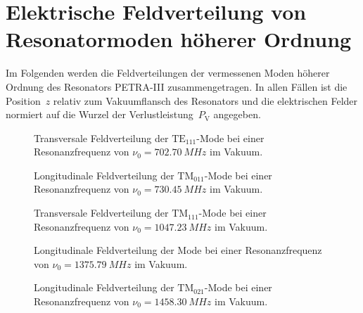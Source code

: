 \section{Elektrische Feldverteilung von Resonatormoden höherer Ordnung}
\label{app:hom_felder}
\FloatBarrier
Im Folgenden werden die Feldverteilungen der vermessenen Moden höherer Ordnung des Resonators PETRA-III zusammengetragen.
In allen Fällen ist die Position~$z$ relativ zum Vakuumflansch des Resonators und die elektrischen Felder normiert auf die Wurzel der Verlustleistung~$P_\mathrm{V}$ angegeben.
\begin{figure}[h]
  \centering
  
  \caption[Transversale Feldverteilung der $\mathrm{TE}_{111}$-Mode \mbox{$\nu_0 = \SI{702.70}{MHz}$}]{Transversale Feldverteilung der $\mathrm{TE}_{111}$-Mode bei einer Resonanzfrequenz von \mbox{$\nu_0 = \SI{702.70}{MHz}$} im Vakuum.}
\end{figure}

\begin{figure}[p]
	\centering
	
	
	\caption[Longitudinale Feldverteilung der $\mathrm{TM}_{011}$-Mode \mbox{$\nu_0 = \SI{730.45}{MHz}$}]{Longitudinale Feldverteilung der $\mathrm{TM}_{011}$-Mode bei einer Resonanzfrequenz von \mbox{$\nu_0 = \SI{730.45}{MHz}$} im Vakuum.}
	
	
	\caption[Transversale Feldverteilung der $\mathrm{TM}_{111}$-Mode \mbox{$\nu_0 = \SI{1047.23}{MHz}$}]{Transversale Feldverteilung der $\mathrm{TM}_{111}$-Mode bei einer Resonanzfrequenz von \mbox{$\nu_0 = \SI{1047.23}{MHz}$} im Vakuum.}
\end{figure}

\begin{figure}[p]
	\centering
	
	
	\caption[Longitudinale Feldverteilung der Mode \mbox{$\nu_0 = \SI{1375.79}{MHz}$}]{Longitudinale Feldverteilung der Mode bei einer Resonanzfrequenz von \mbox{$\nu_0 = \SI{1375.79}{MHz}$} im Vakuum.}
	
    
    \caption[Longitudinale Feldverteilung der $\mathrm{TM}_{021}$-Mode \mbox{$\nu_0 = \SI{1458.30}{MHz}$}]{Longitudinale Feldverteilung der $\mathrm{TM}_{021}$-Mode bei einer Resonanzfrequenz von \mbox{$\nu_0 = \SI{1458.30}{MHz}$} im Vakuum.}
\end{figure}

